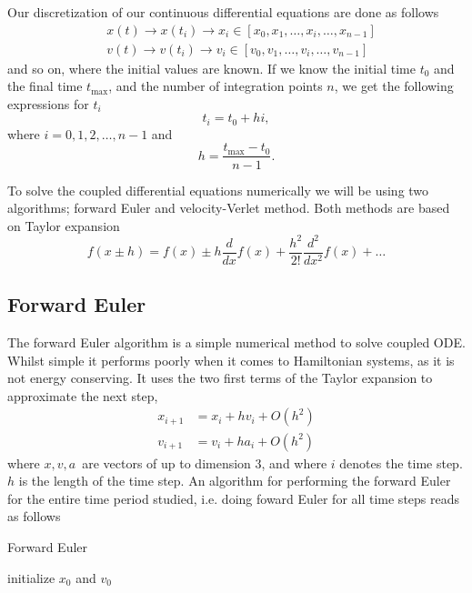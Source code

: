 \documentclass[%
reprint,
nofootinbib,
amsmath,amssymb,
aps,
]{revtex4-1}
\begin{document}
Our discretization of our continuous differential equations are done as follows
\begin{equation}
	\begin{split}
		&x(t) \rightarrow x(t_i) \rightarrow x_i \in [x_0, x_1, \dots, x_i, \dots, x_{n-1}]\\
		&v(t) \rightarrow v(t_i) \rightarrow v_i \in [v_0, v_1, \dots, v_i, \dots, v_{n-1}]
	\end{split}
\end{equation}
and so on, where the initial values are known. If we know the initial time $t_0$ and the final time $t_{\text{max}}$, and the number of integration points $n$, we get the following expressions for $t_i$ 
\begin{equation}
	t_i = t_0 + hi,
\end{equation}
where $i = 0,1,2,\dots,n-1$ and 
\begin{equation}
	h = \frac{t_{\text{max}} - t_0}{n-1}.
\end{equation}

To solve the coupled differential equations numerically we will be using two algorithms; forward Euler and velocity-Verlet method. Both methods are based on Taylor expansion 
\begin{equation}
	f(x\pm h) = f(x) \pm h\frac{d}{dx}f(x) + \frac{h^2}{2!}\frac{d^2}{dx^2}f(x) + \dots 
\end{equation}
\subsection{Forward Euler}%
The forward Euler algorithm is a simple numerical method to solve coupled ODE. Whilst simple it performs poorly when it comes to Hamiltonian systems, as it is not energy conserving. It uses the two first terms of the Taylor expansion to approximate the next step,
\begin{align}
	x_{i+1} &= x_i + hv_i + O(h^2)\\
	v_{i+1} &= v_i + ha_i + O(h^2)
\end{align}
where $x,v,a$ are vectors of up to dimension 3, and where $i$ denotes the time step. $h$ is the length of the time step. An algorithm for performing the forward Euler for the entire time period studied, i.e. doing foward Euler for all time steps reads as follows
\begin{algorithm}[H]\label{algo:FE}
	\SetAlgoLined
	\caption{Forward Euler}
	initialize $x_0$ and $v_0$\;
\end{algorithm}
\end{document}
